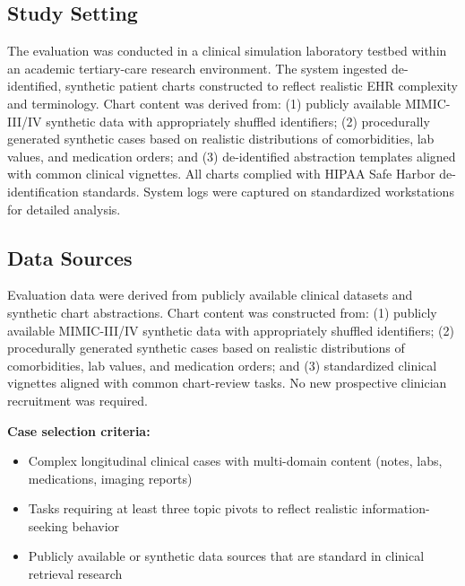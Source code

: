 \documentclass[preprint,12pt]{elsarticle}
\begin{document}
\subsection{Study Setting}
The evaluation was conducted in a clinical simulation laboratory testbed within an academic tertiary-care research environment. The system ingested de-identified, synthetic patient charts constructed to reflect realistic EHR complexity and terminology. Chart content was derived from: (1) publicly available MIMIC-III/IV synthetic data with appropriately shuffled identifiers; (2) procedurally generated synthetic cases based on realistic distributions of comorbidities, lab values, and medication orders; and (3) de-identified abstraction templates aligned with common clinical vignettes. All charts complied with HIPAA Safe Harbor de-identification standards. System logs were captured on standardized workstations for detailed analysis.

\subsection{Data Sources}
Evaluation data were derived from publicly available clinical datasets and synthetic chart abstractions. Chart content was constructed from: (1) publicly available MIMIC-III/IV synthetic data with appropriately shuffled identifiers; (2) procedurally generated synthetic cases based on realistic distributions of comorbidities, lab values, and medication orders; and (3) standardized clinical vignettes aligned with common chart-review tasks. No new prospective clinician recruitment was required.

\textbf{Case selection criteria:}
\begin{itemize}
  \item Complex longitudinal clinical cases with multi-domain content (notes, labs, medications, imaging reports)
  \item Tasks requiring at least three topic pivots to reflect realistic information-seeking behavior
  \item Publicly available or synthetic data sources that are standard in clinical retrieval research
\end{itemize}
\end{document}
